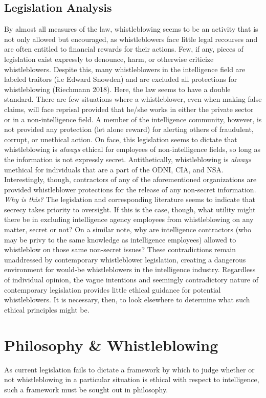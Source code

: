 \documentclass [12 pt] {article}
\begin{document}
\subsection {Legislation Analysis}
By almost all measures of the law, whistleblowing seems to be an activity that is not only allowed but encouraged, as whistleblowers face little legal recourses and are often entitled to financial rewards for their actions. Few, if any, pieces of legislation exist expressly to denounce, harm, or otherwise criticize whistleblowers. Despite this, many whistleblowers in the intelligence field are labeled traitors (i.e Edward Snowden) and are excluded all protections for whistleblowing (Riechmann 2018). Here, the law seems to have a double standard. There are few situations where a whistleblower, even when making false claims, will face reprisal provided that he/she works in either the private sector or in a non-intelligence field. A member of the intelligence community, however, is not provided any protection (let alone reward) for alerting others of fraudulent, corrupt, or unethical action. On face, this legislation seems to dictate that whistleblowing is \textit{always} ethical for employees of non-intelligence fields, so long as the information is not expressly secret. Antithetically, whistleblowing is \textit{always} unethical for individuals that are a part of the ODNI, CIA, and NSA. Interestingly, though, contractors of any of the aforementioned organizations are provided whistleblower protections for the release of any non-secret information. \textit{Why is this?}
\bigbreak
The legislation and corresponding literature seems to indicate that secrecy takes priority to oversight. If this is the case, though, what utility might there be in excluding intelligence agency employees from whistleblowing on any matter, secret or not? On a similar note, why are intelligence contractors (who may be privy to the same knowledge as intelligence employees) allowed to whistleblow on those same non-secret issues? These contradictions remain unaddressed by contemporary whistleblower legislation, creating a dangerous environment for would-be whistleblowers in the intelligence industry. Regardless of individual opinion, the vague intentions and seemingly contradictory nature of contemporary legislation provides little ethical guidance for potential whistleblowers. It is necessary, then, to look elsewhere to determine what such ethical principles might be.
\section{Philosophy \& Whistleblowing}
As current legislation fails to dictate a framework by which to judge whether or not whistleblowing in a particular situation is ethical with respect to intelligence, such a framework must be sought out in philosophy.
\end{document}

